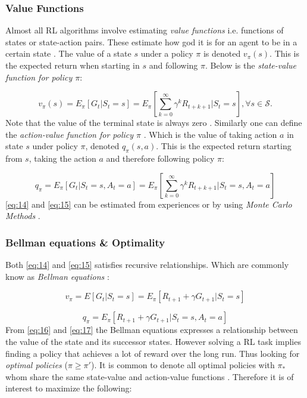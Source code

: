\documentclass{kththesis}
\theoremstyle{definition}
\begin{document}
\subsubsection*{Value Functions}

Almost all RL algorithms involve estimating \textit{value functions} i.e. functions of states or state-action pairs. These estimate how god it is for an agent to be in a certain state \parencite{sutton1998reinforcement, li2017deep}. The value of a state $s$ under a policy $\pi$ is denoted $v_{\pi}(s)$. This is the expected return when starting in $s$ and following $\pi$. Below is the \textit{state-value function for policy $\pi$}:

\begin{equation}
    \label{eq:14}
    v_{\pi}(s) = E_{\pi}[G_t | S_t = s] = E_{\pi}\left[\sum_{k=0}^{\infty}{\gamma^{k}R_{t+k+1}} | S_t = s\right], \forall s \in \mathcal{S}.
\end{equation}
Note that the value of the terminal state is always zero \parencite{sutton1998reinforcement}. Similarly  one can define the \textit{action-value function for policy $\pi$} \parencite{sutton1998reinforcement}. Which is the value of taking action $a$ in state $s$ under policy $\pi$, denoted $q_{\pi}(s,a)$. This is the expected return starting from $s$, taking the action $a$ and therefore following policy $\pi$:

\begin{equation}
    \label{eq:15}
    q_{\pi} = E_{\pi}[G_t | S_t =s, A_t = a] = E_{\pi} \left[\sum_{k=0}^{\infty}{\gamma^{k}R_{t+k+1}} | S_t=s, A_t=a \right]
\end{equation}
\autoref{eq:14} and \autoref{eq:15} can be estimated from experiences or by using \textit{Monte Carlo Methods} \parencite{sutton1998reinforcement}.

\subsubsection*{Bellman equations \& Optimality}
Both \autoref{eq:14} and \autoref{eq:15} satisfies recursive relationships. Which are commonly know as \textit{Bellman equations} \parencite{sutton1998reinforcement}:

\begin{equation}
    \label{eq:16}
    v_{\pi} = E[G_t | S_t = s] = E_{\pi}[R_{t+1} + \gamma G_{t+1} | S_t = s]
\end{equation}

\begin{equation}
    \label{eq:17}
    q_{\pi} = E_{\pi}[R_{t+1} + \gamma G_{t+1} | S_t = s,  A_t = a]
\end{equation}
From \autoref{eq:16} and \autoref{eq:17} the Bellman equations expresses a relationship between the value of the state and its successor states. However solving a RL task implies finding a policy that achieves a lot of reward over the long run. Thus looking for \textit{optimal policies} ($\pi \geq \pi'$). It is common to denote all optimal policies with $\pi_{*}$ whom share the same state-value and action-value functions \parencite{sutton1998reinforcement}. Therefore it is of interest to maximize the following:
\end{document}

